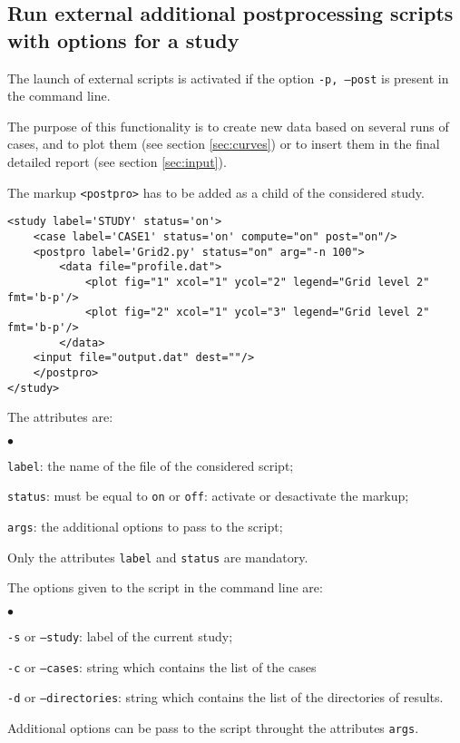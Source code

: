 \documentclass[a4paper,10pt,twoside]{csshortdoc}
\begin{document}
\subsection{Run external additional postprocessing scripts with options for a study}

The launch of external scripts is activated if the option \texttt{-p, --post}
is present in the command line.

The purpose of this functionality is to create new data based on several runs of
cases, and to plot them (see section \ref{sec:curves}) or to insert them in the
final detailed report (see section \ref{sec:input}).

The markup \texttt{<postpro>} has to be added as a child of the considered study.

\small
\begin{verbatim}
<study label='STUDY' status='on'>
    <case label='CASE1' status='on' compute="on" post="on"/>
    <postpro label='Grid2.py' status="on" arg="-n 100">
        <data file="profile.dat">
            <plot fig="1" xcol="1" ycol="2" legend="Grid level 2" fmt='b-p'/>
            <plot fig="2" xcol="1" ycol="3" legend="Grid level 2" fmt='b-p'/>
        </data>
    <input file="output.dat" dest=""/>
    </postpro>
</study>
\end{verbatim}
\normalsize

The attributes are:
\begin{list}{$\bullet$}{}
\item \texttt{label}: the name of the file of the considered script;
\item \texttt{status}: must be equal to \texttt{on} or \texttt{off}:
activate or desactivate the markup;
\item \texttt{args}: the additional options to pass to the script;
\end{list}

Only the attributes \texttt{label} and \texttt{status} are mandatory.

The options given to the script in the command line are:
\begin{list}{$\bullet$}{}
\item \texttt{-s} or \texttt{--study}: label of the current study;
\item \texttt{-c} or \texttt{--cases}: string which contains the list of the cases
\item \texttt{-d} or \texttt{--directories}: string which contains the list
of the directories of results.
\end{list}
Additional options can be pass to the script throught the attributes \texttt{args}.
\end{document}
